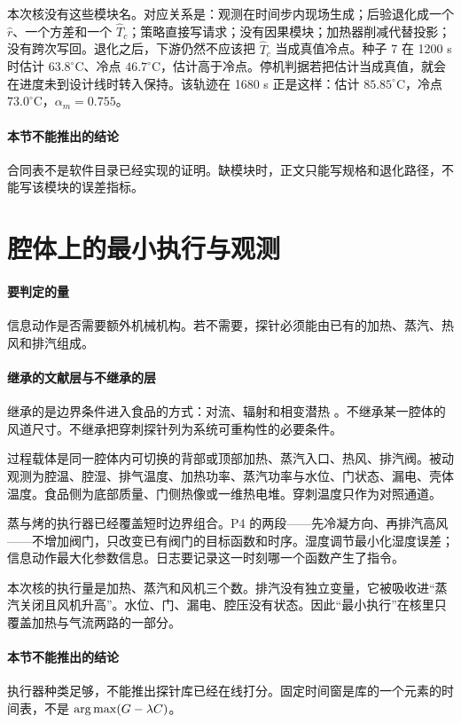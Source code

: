 本次核没有这些模块名。对应关系是：观测在时间步内现场生成；后验退化成一个 \(\hat r\)、一个方差和一个 \(\hat T_c\)；策略直接写请求；没有因果模块；加热器削减代替投影；没有跨次写回。退化之后，下游仍然不应该把 \(\hat T_c\) 当成真值冷点。种子 7 在 1200 s 时估计 \(63.8^\circ\mathrm{C}\)、冷点 \(46.7^\circ\mathrm{C}\)，估计高于冷点。停机判据若把估计当成真值，就会在进度未到设计线时转入保持。该轨迹在 1680 s 正是这样：估计 \(85.85^\circ\mathrm{C}\)，冷点 \(73.0^\circ\mathrm{C}\)，\(\alpha_m=0.755\)。

\paragraph{本节不能推出的结论}
合同表不是软件目录已经实现的证明。缺模块时，正文只能写规格和退化路径，不能写该模块的误差指标。

\section{腔体上的最小执行与观测}

\paragraph{要判定的量}
信息动作是否需要额外机械机构。若不需要，探针必须能由已有的加热、蒸汽、热风和排汽组成。

\paragraph{继承的文献层与不继承的层}
继承的是边界条件进入食品的方式：对流、辐射和相变潜热 \cite{datta2007}。不继承某一腔体的风道尺寸。不继承把穿刺探针列为系统可重构性的必要条件。

过程载体是同一腔体内可切换的背部或顶部加热、蒸汽入口、热风、排汽阀。被动观测为腔温、腔湿、排气温度、加热功率、蒸汽功率与水位、门状态、漏电、壳体温度。食品侧为底部质量、门侧热像或一维热电堆。穿刺温度只作为对照通道。

蒸与烤的执行器已经覆盖短时边界组合。P4 的两段——先冷凝方向、再排汽高风——不增加阀门，只改变已有阀门的目标函数和时序。湿度调节最小化湿度误差；信息动作最大化参数信息。日志要记录这一时刻哪一个函数产生了指令。

本次核的执行量是加热、蒸汽和风机三个数。排汽没有独立变量，它被吸收进“蒸汽关闭且风机升高”。水位、门、漏电、腔压没有状态。因此“最小执行”在核里只覆盖加热与气流两路的一部分。

\paragraph{本节不能推出的结论}
执行器种类足够，不能推出探针库已经在线打分。固定时间窗是库的一个元素的时间表，不是 \(\operatorname*{arg\,max}(G-\lambda C)\)。
